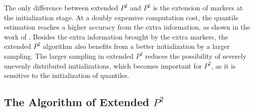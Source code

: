 The only difference between extended $P^2$ and $P^2$ is the extension of markers at the initialization stage. At a doubly expensive computation cost, the quantile estimation reaches a higher accuracy from the extra information, as shown in the work of \citeauthor{raatikainenSequentialProcedureSimultaneous1993}\cite{raatikainenSequentialProcedureSimultaneous1993}. Besides the extra information brought by the extra markers, the extended $P^2$ algorithm also benefits from a better initialization by a larger sampling. The larger sampling in extended $P^2$ reduces the possibility of severely unevenly distributed initializations, which becomes important for  $P^2$, as it is sensitive to the initialization of quantiles.

\subsection{The Algorithm of Extended $P^2$}
\label{subsec: algo_extended_{p2}}

